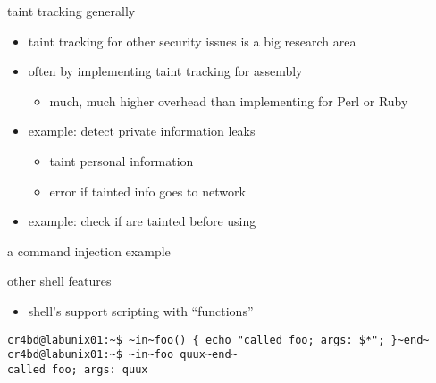 \begin{frame}{taint tracking generally}
    \begin{itemize}
    \item taint tracking for other security issues is a big research area
    \item often by implementing taint tracking for assembly
        \begin{itemize}
        \item much, much higher overhead than implementing for Perl or Ruby
        \end{itemize}
   \item<2->example: detect private information leaks
        \begin{itemize}
        \item taint personal information
        \item error if tainted info goes to network
        \end{itemize}
    \item<2-> example: check if  are tainted before using
    \end{itemize}
\end{frame}



    



\begin{frame}{a command injection example}
\end{frame}

\begin{frame}[fragile,label=shellShock]{other shell features}
\begin{itemize}
    \item shell's support scripting with ``functions''
\end{itemize}
\begin{lstlisting}
cr4bd@labunix01:~$ ~in~foo() { echo "called foo; args: $*"; }~end~
cr4bd@labunix01:~$ ~in~foo quux~end~
called foo; args: quux
\end{lstlisting}
\end{frame}

